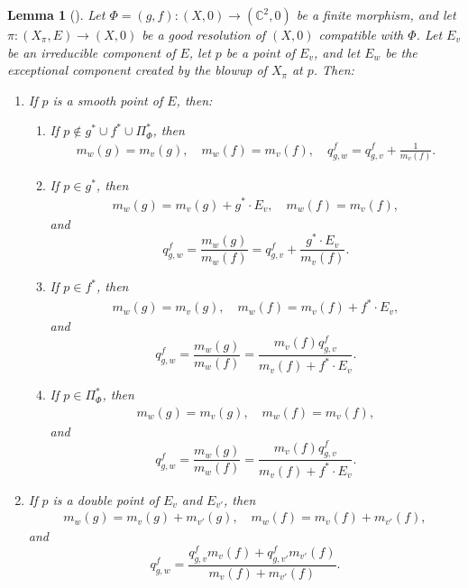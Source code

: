 \documentclass[reqno,dvipsnames,12pt]{amsart}
\newtheorem{lemm}[thm]{Lemma}
\begin{document}
\begin{lemm}[{\cite[Lemma 6.6]{yenni1}}]\label{recurence}
Let $\Phi=(g,f): (X,0) \longrightarrow (\mathbb{C}^2,0)$ be a finite morphism, and let
$\pi :(X_{\pi},E) \longrightarrow (X,0)$ be a good resolution of $(X,0)$ compatible with $\Phi$.
Let $E_v$ be an irreducible component of $E$, let $p$ be a point of $E_v$, and let $E_{w}$ be the exceptional component created by the blowup of $X_{\pi}$ at $p$. Then:
\begin{enumerate}
\item If $p$ is a smooth point of $E$, then:
\begin{enumerate}
\item If $p \notin g^* \cup f^* \cup \Pi_{\Phi}^*$, then
\begin{align*}
m_w(g)=m_v(g), \quad m_w(f)=m_v(f), \quad
q_{g,w}^f=q_{g,v}^f+\frac{1}{m_v(f)}.
\end{align*}

\item If $p \in g^*$, then
\begin{align*}
m_w(g)=m_v(g)+g^*\cdot E_v, \quad m_w(f)=m_v(f),
\end{align*}
and
\[
q_{g,w}^f=\frac{m_w(g)}{m_w(f)}
= q_{g,v}^f + \frac{g^* \cdot E_v}{m_v(f)}.
\]

\item If $p \in f^*$, then
\begin{align*}
m_w(g)=m_v(g), \quad m_w(f)=m_v(f)+f^*\cdot E_v,
\end{align*}
and
\[
q_{g,w}^f=\frac{m_w(g)}{m_w(f)}
=\frac{m_v(f)q_{g,v}^f}{m_v(f)+f^*\cdot E_v}.
\]

\item If $p \in \Pi_{\Phi}^*$, then
\begin{align*}
m_w(g)=m_v(g), \quad m_w(f)=m_v(f),
\end{align*}
and
\[
q_{g,w}^f=\frac{m_w(g)}{m_w(f)}
=\frac{m_v(f)q_{g,v}^f}{m_v(f)+f^*\cdot E_v}.
\]
\end{enumerate}

\item If $p$ is a double point of $E_v$ and $E_{v'}$, then
\begin{align*}
m_w(g)=m_v(g)+m_{v'}(g), \quad
m_w(f)=m_v(f)+m_{v'}(f),
\end{align*}
and
\[
q_{g,w}^f
=\frac{q_{g,v}^f m_v(f) + q_{g,v'}^f m_{v'}(f)}{m_v(f)+m_{v'}(f)}.
\]
\end{enumerate}
\end{lemm}
\end{document}
